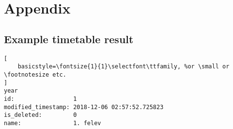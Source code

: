 \appendix
\chapter*{Appendix}
\setcounter{chapter}{6}
\setcounter{equation}{0}


\section{Example timetable result}

\begin{lstlisting}[
    basicstyle=\fontsize{1}{1}\selectfont\ttfamily, %or \small or \footnotesize etc.
]
year                
id:                 1
modified_timestamp: 2018-12-06 02:57:52.725823
is_deleted:         0
name:               1. felev


\end{lstlisting}
